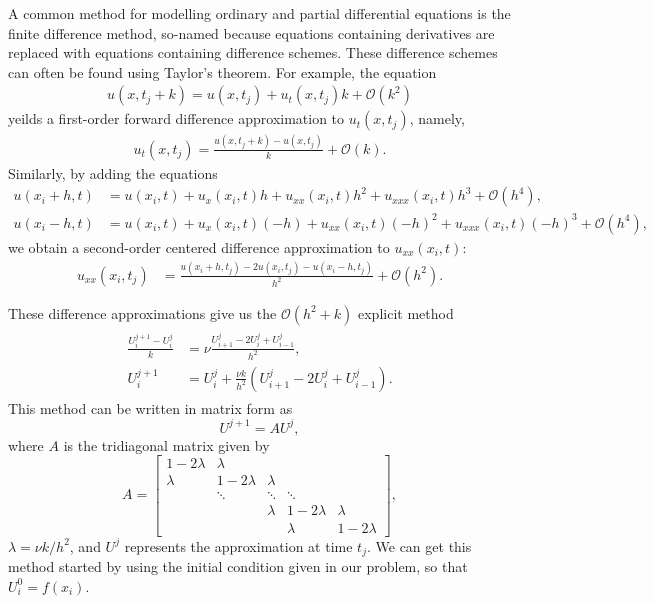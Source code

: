 A common method for modelling ordinary and partial differential equations is the finite difference method, so-named because equations containing derivatives are replaced with equations containing difference schemes. These difference schemes can often be found using Taylor's theorem. For example, the equation 
\begin{align*}
	u(x,t_j + k) = u(x,t_j) + u_t(x,t_j)k + \mathcal{O}(k^2)
\end{align*}
yeilds a first-order forward difference approximation to $u_t(x,t_j)$, namely, 
\begin{align*}
	u_t(x,t_j ) = \frac{u(x,t_j+k) - u(x,t_j)}{k} + \mathcal{O}(k).
\end{align*}
Similarly, by adding the equations 
\begin{align*}
	u(x_i+h,t) &= u(x_i,t) + u_x(x_i,t)h + u_{xx}(x_i,t)h^2 + u_{xxx}(x_i,t)h^3 + \mathcal{O}(h^4),\\
		u(x_i-h,t) &= u(x_i,t) + u_x(x_i,t)(-h) + u_{xx}(x_i,t)(-h)^2 + u_{xxx}(x_i,t)(-h)^3 + \mathcal{O}(h^4),
\end{align*}
we obtain a second-order centered difference approximation to $u_{xx}(x_i,t)$:
\begin{align*}
	u_{xx}(x_i,t_j) &= \frac{u(x_i + h,t_j )-2 u(x_i,t_j)- u(x_i - h,t_j)}{h^2} + \mathcal{O}(h^2).
\end{align*}


These difference approximations give us the $\mathcal{O}(h^2 + k)$ explicit method 
\begin{align}
	\begin{split}
	\frac{U_{i}^{j+1} - U_{i}^{j}}{k} &= \nu \frac{U_{i+1}^{j}- 2U_{i}^{j} + U_{i-1}^{j} }{h^2} ,\\ 
	U_{i}^{j+1} &= U_{i}^{j} + \frac{\nu k}{h^2} (U_{i+1}^{j}- 2U_{i}^{j} + U_{i-1}^{j} ). 
	\end{split}\label{firstorder_explicit}
\end{align}
This method can be written in matrix form as 
\[
U^{j+1} = A U^j,
\]
where $A$ is the tridiagonal matrix given by 
\[
A = \left[\begin{array}{cccccc}1-2\lambda & \lambda &  &  &   \\ \lambda & 1-2\lambda & \lambda &  &   \\  & \ddots & \ddots & \ddots &  \\  &  & \lambda & 1-2\lambda & \lambda \\  &  &  & \lambda & 1-2\lambda\end{array}\right],
\]
$\lambda = \nu k/h^2$, and $U^j$ represents the approximation at time $t_j$. We can get this method started by using the initial condition given in our problem, so that $U_{i}^{0} = f(x_i)$. 

